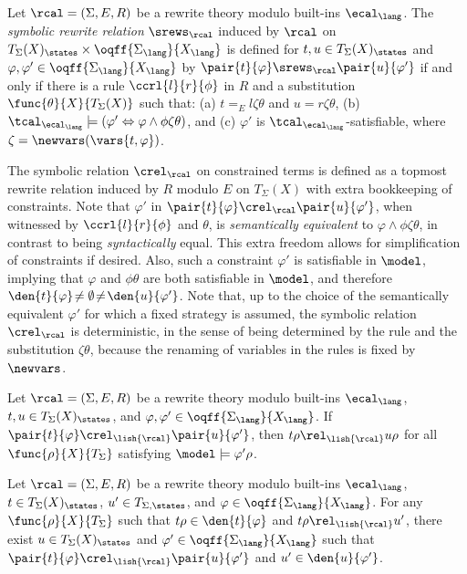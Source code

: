 \begin{definition}\label{def.symbolic}
  Let $\rcal = (\Sigma, E, R)$ be a rewrite theory modulo built-ins
  $\ecal_\lang$.  The {\em symbolic rewrite relation} $\srews_{\rcal}$
  induced by $\rcal$ on $T_{\Sigma}(X)_\states \times
  \oqff{\Sigma_\lang}{X_\lang}$ is defined for $t,u \in
  T_{\Sigma}(X)_\states$ and $\varphi,\varphi' \in
  \oqff{\Sigma_\lang}{X_\lang}$ by $\pair{t}{\varphi} \srews_{\rcal}
  \pair{u}{\varphi'}$ if and only if there is a rule
  $\ccrl{l}{r}{\phi}$ in $R$ and a substitution
  $\func{\theta}{X}{T_{\Sigma}(X)}$ such that: (a) $t =_E
  l\zeta\theta$ and $u = r\zeta\theta$, (b) $\tcal_{\ecal_\lang}
  \models (\varphi' \Leftrightarrow \varphi \land \phi\zeta\theta)$,
  and (c) $\varphi'$ is
  $\tcal_{\ecal_\lang}$-satisfiable, \label{def.symbolic.c} where
  $\zeta = \newvars(\vars{t,\varphi})$.
\end{definition}
%
The symbolic relation $\crel_\rcal$ on constrained terms is defined as
a topmost rewrite relation induced by $R$ modulo $E$ on
$T_\Sigma(X)$ with extra bookkeeping of constraints.  Note that
$\varphi'$ in $\pair{t}{\varphi} \crel_\rcal \pair{u}{\varphi'}$, when
witnessed by $\ccrl{l}{r}{\phi}$ and $\theta$, is {\em semantically
  equivalent} to $\varphi \land \phi\zeta\theta$, in contrast to being
{\em syntactically} equal.  This extra freedom allows for
simplification of constraints if desired.  Also, such a constraint
$\varphi'$ is satisfiable in $\model$, implying that $\varphi$ and
$\phi\theta$ are both satisfiable in $\model$, and therefore
$\den{t}{\varphi} \!\neq \emptyset\! \neq\!  \den{u}{\varphi'}$. Note
that, up to the choice of the semantically equivalent $\varphi'$ for
which a fixed strategy is assumed, the symbolic relation $\crel_\rcal$
is deterministic, in the sense of being determined by the rule and the
substitution $\zeta\theta$, because the renaming of variables in the
rules is fixed by $\newvars$.

\begin{theorem}\label{thm.sound}
  Let $\rcal = (\Sigma,E,R)$ be a rewrite theory modulo built-ins
  $\ecal_\lang$, $t,u\in T_\Sigma(X)_\states$, and
  $\varphi,\varphi'\in\oqff{\Sigma_\lang}{X_\lang}$. If
  $\pair{t}{\varphi} \crel_{\lish{\rcal}} \pair{u}{\varphi'}$, then
  $t\rho\rel_{\lish{\rcal}} u\rho$ for all
  $\func{\rho}{X}{T_{\Sigma}}$ satisfying
  $\model\models\varphi'\rho$.
\end{theorem}

\begin{theorem}
  \label{thm.comp}
  Let $\rcal = (\Sigma,E,R)$ be a rewrite theory modulo built-ins
  $\ecal_\lang$, $t \in T_\Sigma(X)_\states$, $u' \in
  T_{\Sigma,\states}$, and $\varphi\in\oqff{\Sigma_\lang}{X_\lang}$.
  For any $\func{\rho}{X}{T_{\Sigma}}$ such that
  $t\rho\in\den{t}{\varphi}$ and $t\rho\rel_{\lish{\rcal}} u'$, there
  exist $u\in T_\Sigma(X)_\states$ and
  $\varphi'\in\oqff{\Sigma_\lang}{X_\lang}$ such that
  $\pair{t}{\varphi}\crel_{\lish{\rcal}}\pair{u}{\varphi'}$ and
  $u'\in\den{u}{\varphi'}$.
\end{theorem}


